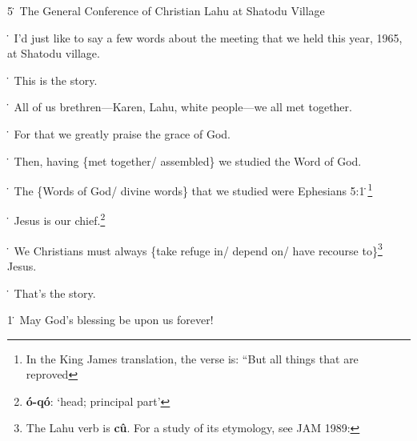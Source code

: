 
5\. The General Conference of Christian Lahu at Shatodu Village

\. I'd just like to say a few words  about the meeting that we held this year,
1965, at Shatodu village.

\. This is the story.

\. All of us brethren---Karen, Lahu, white people---we all met together.

\. For that we greatly praise the grace of God.

\. Then, having \{met together/ assembled\} we studied the Word of God.

\. The \{Words of God/ divine words\} that we studied were Ephesians 5:1\.\footnote{In the King James translation, the verse is: ``But all things that are reproved}

\. Jesus is our chief.\footnote{\textbf{ó-qó}: `head; principal part'}

\. We Christians must always \{take refuge in/ depend on/ have recourse to\}\footnote{The Lahu verb is \textbf{cû}. For a study of its etymology, see JAM 1989:}
Jesus.

\. That's the story.

1\. May God's blessing be upon us forever!

